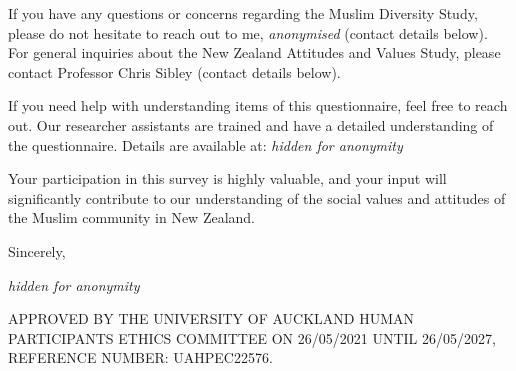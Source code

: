 \documentclass[
]{interact}
\begin{document}
\noindent If you have any questions or concerns regarding the Muslim
Diversity Study, please do not hesitate to reach out to me,
\emph{anonymised} (contact details below). For general inquiries about
the New Zealand Attitudes and Values Study, please contact Professor
Chris Sibley (contact details below).

\noindent If you need help with understanding items of this
questionnaire, feel free to reach out. Our researcher assistants are
trained and have a detailed understanding of the questionnaire. Details
are available at: \emph{hidden for anonymity}

\noindent Your participation in this survey is highly valuable, and your
input will significantly contribute to our understanding of the social
values and attitudes of the Muslim community in New Zealand.

\noindent Sincerely,

\emph{hidden for anonymity}

\noindent APPROVED BY THE UNIVERSITY OF AUCKLAND HUMAN PARTICIPANTS
ETHICS COMMITTEE ON 26/05/2021 UNTIL 26/05/2027, REFERENCE NUMBER:
UAHPEC22576.
\end{document}
